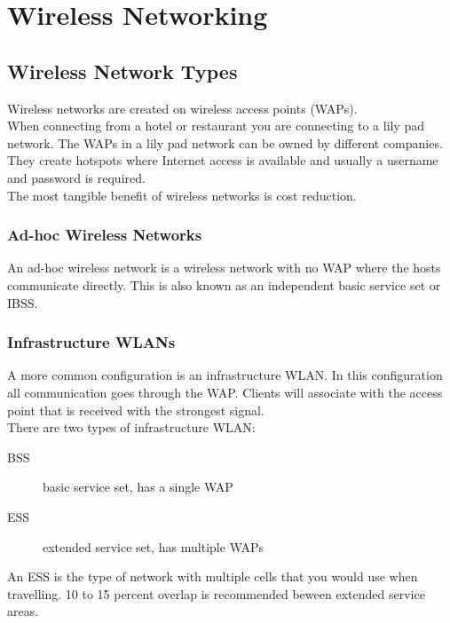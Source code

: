 \section{Wireless Networking}

\subsection{Wireless Network Types}

Wireless networks are created on wireless access points (WAPs).\\

When connecting from a hotel or restaurant you are connecting to a lily pad
network. The WAPs in a lily pad network can be owned by different companies.
They create hotspots where Internet access is available and usually a username
and password is required.\\

The most tangible benefit of wireless networks is cost reduction.

\subsubsection{Ad-hoc Wireless Networks}

An ad-hoc wireless network is a wireless network with no WAP where the hosts
communicate directly. This is also known as an independent basic service set
or IBSS.

\subsubsection{Infrastructure WLANs}

A more common configuration is an infrastructure WLAN. In this configuration
all communication goes through the WAP. Clients will associate with the
access point that is received with the strongest signal.\\

There are two types of infrastructure WLAN:

\begin{description}

\item[BSS]
basic service set, has a single WAP

\item[ESS]
extended service set, has multiple WAPs

\end{description}

An ESS is the type of network with multiple cells that you would use when
travelling. 10 to 15 percent overlap is recommended beween extended service
areas.\\

